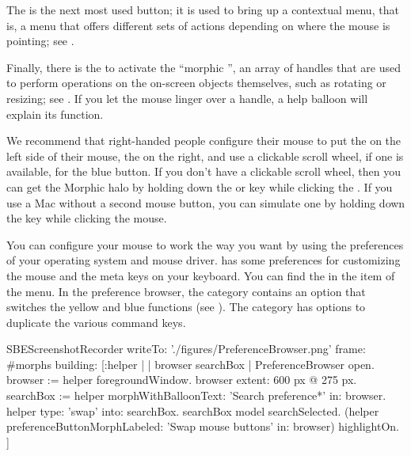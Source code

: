 \documentclass[a4paper,10pt,twoside]{book}
\begin{document}
The  is the next most used button; it is used to bring up a contextual menu, that is, a menu that offers different sets of actions depending on where the mouse is pointing; see .


Finally, there is the  to activate the ``morphic '', an array of handles that are used to perform operations on the on-screen objects themselves, such as rotating or resizing; see .
If you let the mouse linger over a handle, a help balloon will explain its function.


We recommend that right-handed people configure their mouse to put the  on the left side of their mouse, the  on the right, and use a clickable scroll wheel, if one is available, for the blue button.
If you don't have a clickable scroll wheel, then you can get the Morphic halo by holding down the  or  key while clicking the .
If you use a Mac without a second mouse button, you can simulate one by holding down the \clover{} key while clicking the mouse.

You can configure your mouse to work the way you want by using the preferences of your operating system and mouse driver.
\sq has some preferences for customizing the mouse and the meta keys on your keyboard.
You can find the  in the  item of the  menu.
In the preference browser, the  category contains an option  that switches the yellow and blue functions (see ).
The  category has options to duplicate the various command keys.


\begin{ExecuteSmalltalkScript}
SBEScreenshotRecorder writeTo: './figures/PreferenceBrowser.png' frame: #morphs building: [:helper |
	| browser searchBox |
	PreferenceBrowser open.
	browser := helper foregroundWindow.
	browser extent: 600 px @ 275 px.
	searchBox := helper morphWithBalloonText: 'Search preference*' in: browser.
	helper type: 'swap' into: searchBox.
	searchBox model searchSelected.
	(helper preferenceButtonMorphLabeled: 'Swap mouse buttons' in: browser) highlightOn.
]
\end{ExecuteSmalltalkScript}
\end{document}

